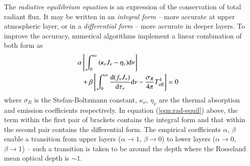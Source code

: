 		The \textit{radiative equilibrium equation} is an expression of the conservation of total radiant flux. It may be written in an \textit{integral form} -- more accurate at upper atmospheric layer, or in a \textit{differential form} -- more accurate in deeper layers. To improve the accuracy, numerical algorithms implement a linear combination of both form as
		\begin{align}
			\alpha&\left[ \int_{0}^{\infty}{(\kappa_\nu J_\nu-\eta_\nu)\mathrm{d} {\nu}} \right] \nonumber\\
				&+\beta\left[ \int_{0}^{\infty}{\dfrac{\mathrm{d} {(f_\nu J_\nu)}}{\mathrm{d} {\tau_\nu}}\mathrm{d} {\nu}}-\dfrac{\sigma_R}{4\pi}T_\text{eff}^4 \right]=0 \label{eqn:rad-equil}
		\end{align}
		where $\sigma_R$ is the Stefan-Boltzmann constant, $\kappa_\nu$, $\eta_\nu$ are the thermal absorption and emission coefficients respectively. In equation (\ref{eqn:rad-equil}) above, the term within the first pair of brackets contains the integral form and that within the second pair contains the differential form. The empirical coefficients $\alpha$, $\beta$ enable a transition from upper layers ($\alpha\rightarrow 1$, $\beta\rightarrow 0$) to lower layers ($\alpha\rightarrow 0$, $\beta\rightarrow 1$) -- such a transition is taken to be around the depth where the Rosseland mean optical depth is $\sim 1$.
		
